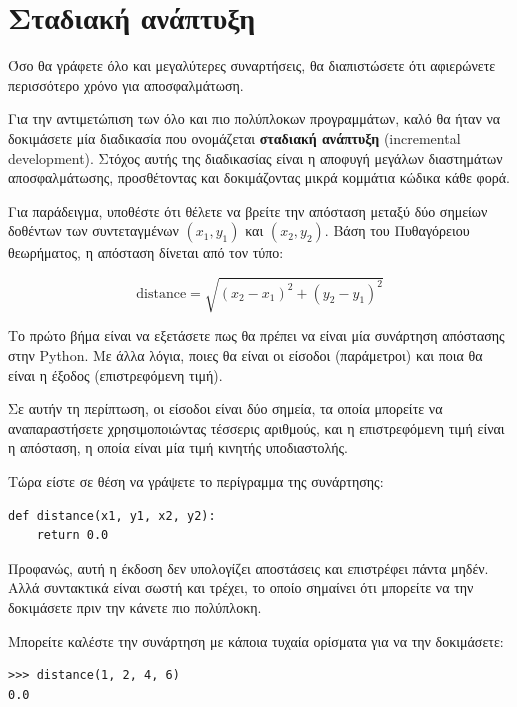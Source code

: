 \documentclass[10pt]{book}
\begin{document}
\section{Σταδιακή ανάπτυξη}
\label{incremental.development}

Όσο θα γράφετε όλο και μεγαλύτερες συναρτήσεις, θα διαπιστώσετε ότι
αφιερώνετε περισσότερο χρόνο για αποσφαλμάτωση.

Για την αντιμετώπιση των όλο και πιο πολύπλοκων προγραμμάτων,
καλό θα ήταν να δοκιμάσετε μία διαδικασία που ονομάζεται
{\bf σταδιακή ανάπτυξη} (incremental development). Στόχος αυτής 
της διαδικασίας είναι η αποφυγή μεγάλων διαστημάτων αποσφαλμάτωσης,  
προσθέτοντας και δοκιμάζοντας μικρά κομμάτια κώδικα κάθε φορά.

Για παράδειγμα, υποθέστε ότι θέλετε να βρείτε την απόσταση μεταξύ
δύο σημείων δοθέντων των συντεταγμένων $(x_1, y_1)$ και $(x_2, y_2)$.
Βάση του Πυθαγόρειου θεωρήματος, η απόσταση δίνεται από τον τύπο:

\begin{displaymath}
\mathrm{distance} = \sqrt{(x_2 - x_1)^2 + (y_2 - y_1)^2}
\end{displaymath}
%

Το πρώτο βήμα είναι να εξετάσετε πως θα πρέπει να είναι μία συνάρτηση
απόστασης στην Python. Με άλλα λόγια, ποιες θα είναι οι είσοδοι (παράμετροι)
και ποια θα είναι η έξοδος (επιστρεφόμενη τιμή).

Σε αυτήν τη περίπτωση, οι είσοδοι είναι δύο σημεία, τα οποία μπορείτε να
αναπαραστήσετε χρησιμοποιώντας τέσσερις αριθμούς, και η επιστρεφόμενη τιμή
είναι η απόσταση, η οποία είναι μία τιμή κινητής υποδιαστολής.

Τώρα είστε σε θέση να γράψετε το περίγραμμα της συνάρτησης:

\begin{verbatim}
def distance(x1, y1, x2, y2):
    return 0.0
\end{verbatim}
%

Προφανώς, αυτή η έκδοση δεν υπολογίζει αποστάσεις και επιστρέφει πάντα
μηδέν. Αλλά συντακτικά είναι σωστή και τρέχει, το οποίο σημαίνει ότι
μπορείτε να την δοκιμάσετε πριν την κάνετε πιο πολύπλοκη.

Μπορείτε καλέστε την συνάρτηση με κάποια τυχαία ορίσματα για να την δοκιμάσετε:

\begin{verbatim}
>>> distance(1, 2, 4, 6)
0.0
\end{verbatim}
%
\end{document}
